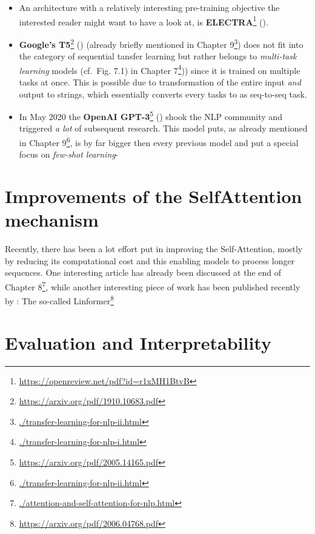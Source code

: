 \documentclass[]{krantz}
\providecommand{\tightlist}{%
  \setlength{\itemsep}{0pt}\setlength{\parskip}{0pt}}
\renewcommand{\href}[2]{#2\footnote{\url{#1}}}
\begin{document}
\begin{itemize}
\tightlist
\item
  An architecture with a relatively interesting pre-training objective the interested reader might want to have a look at, is \href{https://openreview.net/pdf?id=r1xMH1BtvB}{\textbf{ELECTRA}} (\citet{Clark2020ELECTRA}).
\item
  \href{https://arxiv.org/pdf/1910.10683.pdf}{\textbf{Google's T5}} (\citet{raffel2019exploring}) (already briefly mentioned in \href{./transfer-learning-for-nlp-ii.html}{Chapter 9}) does not fit into the category of sequential tansfer learning but rather belongs to \emph{multi-task learning} models (cf.~Fig. 7.1) in \href{./transfer-learning-for-nlp-i.html}{Chapter 7})) since it is trained on multiple tasks at once. This is possible due to transformation of the entire input \emph{and} output to strings, which essentially converts every tasks to as seq-to-seq task.
\item
  In May 2020 the \href{https://arxiv.org/pdf/2005.14165.pdf}{\textbf{OpenAI GPT-3}} (\citet{brown2020language}) shook the NLP community and triggered \emph{a lot} of subsequent research. This model puts, as already mentioned in \href{./transfer-learning-for-nlp-ii.html}{Chapter 9}, is by far bigger then every previous model and put a special focus on \emph{few-shot learning}-
\end{itemize}

\hypertarget{improvements-of-the-selfattention-mechanism}{%
\section{Improvements of the SelfAttention mechanism}\label{improvements-of-the-selfattention-mechanism}}

Recently, there has been a lot effort put in improving the Self-Attention, mostly by reducing its computational cost
and this enabling models to process longer sequences. One interesting article has already been discussed at the end of \href{./attention-and-self-attention-for-nlp.html}{Chapter 8}, while another interesting piece of work has been published recently by \citet{wang2020linformer}: The so-called \href{https://arxiv.org/pdf/2006.04768.pdf}{Linformer}

\hypertarget{evaluation-and-interpretability}{%
\section{Evaluation and Interpretability}\label{evaluation-and-interpretability}}
\end{document}
